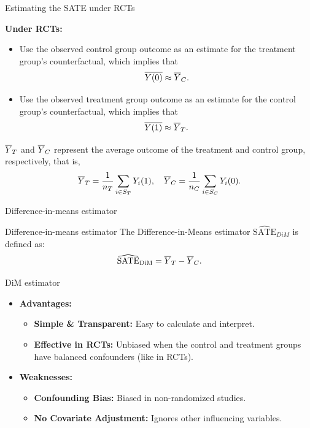 \documentclass[aspectratio=169]{beamer}
\begin{document}
\begin{frame}{Estimating the SATE under RCTs}

\textbf{Under RCTs:} 
\begin{itemize}
    \item Use the observed control group outcome as an estimate for the treatment group’s counterfactual, which implies that
    $$
    \overline{Y(0)} \approx \overline{Y}_C.
    $$
    \item Use the observed treatment group outcome as an estimate for the control group’s counterfactual, which implies that
    $$
    \overline{Y(1)} \approx \overline{Y}_T.
    $$
\end{itemize}
\vspace{0.2cm}

$\overline{Y}_T$ and $\overline{Y}_C$ represent the average outcome of the treatment and control group, respectively, that is,
$$
\overline{Y}_T = \frac{1}{n_T}\sum_{i\in S_T}Y_i(1), \quad \overline{Y}_C = \frac{1}{n_C}\sum_{i\in S_C}Y_i(0). 
$$
        
\end{frame}

\begin{frame}{Difference-in-means estimator}

\begin{coolblock}{Difference-in-means estimator}
    The Difference-in-Means estimator $\widehat{\mathrm{SATE}}_{DiM}$ is defined as:
    $$
    \widehat{\mathrm{SATE}}_{\mathrm{DiM}} = \overline{Y}_T - \overline{Y}_C.
    $$
\end{coolblock}

\end{frame}

\begin{frame}{DiM estimator}
    
    \begin{itemize}
        \item \textbf{Advantages:}
        \begin{itemize}
            \item[$\bullet$] \textbf{Simple \& Transparent:} Easy to calculate and interpret.
            \item[$\bullet$] \textbf{Effective in RCTs:} Unbiased when the control and treatment groups have balanced confounders (like in RCTs).
        \end{itemize}
        \item \textbf{Weaknesses:}
        \begin{itemize}
            \item[$\bullet$] \textbf{Confounding Bias:} Biased in non-randomized studies.
            \item[$\bullet$] \textbf{No Covariate Adjustment:} Ignores other influencing variables. 
        \end{itemize}
    \end{itemize}
    
\end{frame}
\end{document}

